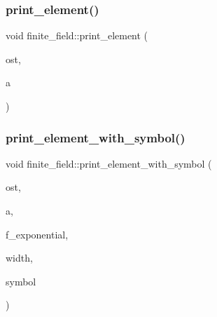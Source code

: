\subsubsection{\texorpdfstring{print\+\_\+element()}{print\_element()}}
{\footnotesize\ttfamily void finite\+\_\+field\+::print\+\_\+element (\begin{DoxyParamCaption}\item[{ostream \&}]{ost,  }\item[{\mbox{\hyperlink{galois_8h_a09fddde158a3a20bd2dcadb609de11dc}{I\+NT}}}]{a }\end{DoxyParamCaption})}

\mbox{\label{classfinite__field_aa0180c961aa4a0a8934cb4dc82e38a4d}} 
\subsubsection{\texorpdfstring{print\+\_\+element\+\_\+with\+\_\+symbol()}{print\_element\_with\_symbol()}}
{\footnotesize\ttfamily void finite\+\_\+field\+::print\+\_\+element\+\_\+with\+\_\+symbol (\begin{DoxyParamCaption}\item[{ostream \&}]{ost,  }\item[{\mbox{\hyperlink{galois_8h_a09fddde158a3a20bd2dcadb609de11dc}{I\+NT}}}]{a,  }\item[{\mbox{\hyperlink{galois_8h_a09fddde158a3a20bd2dcadb609de11dc}{I\+NT}}}]{f\+\_\+exponential,  }\item[{\mbox{\hyperlink{galois_8h_a09fddde158a3a20bd2dcadb609de11dc}{I\+NT}}}]{width,  }\item[{const \mbox{\hyperlink{galois_8h_ab6cc7b4aeb6ea31aba2b3fbfc83ff5e6}{B\+Y\+TE}} $\ast$}]{symbol }\end{DoxyParamCaption})}

\mbox{\label{classfinite__field_a944b7927f6d22e63f5d8ec3f3255f564}} 
